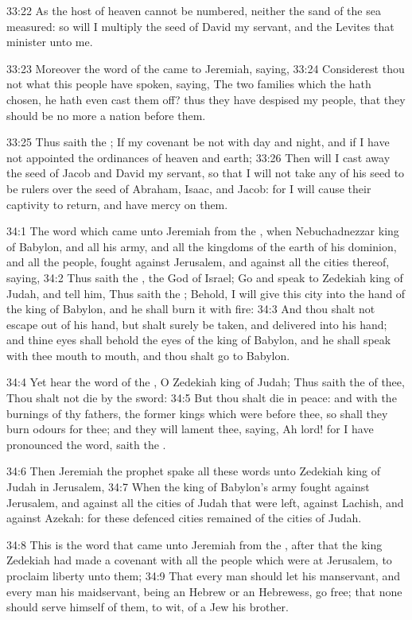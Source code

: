33:22 As the host of heaven cannot be numbered, neither the sand of
the sea measured: so will I multiply the seed of David my servant, and
the Levites that minister unto me.

33:23 Moreover the word of the \LORD came to Jeremiah, saying, 33:24
Considerest thou not what this people have spoken, saying, The two
families which the \LORD hath chosen, he hath even cast them off? thus
they have despised my people, that they should be no more a nation
before them.

33:25 Thus saith the \LORD; If my covenant be not with day and night,
and if I have not appointed the ordinances of heaven and earth; 33:26
Then will I cast away the seed of Jacob and David my servant, so that
I will not take any of his seed to be rulers over the seed of Abraham,
Isaac, and Jacob: for I will cause their captivity to return, and have
mercy on them.

34:1 The word which came unto Jeremiah from the \LORD, when
Nebuchadnezzar king of Babylon, and all his army, and all the kingdoms
of the earth of his dominion, and all the people, fought against
Jerusalem, and against all the cities thereof, saying, 34:2 Thus saith
the \LORD, the God of Israel; Go and speak to Zedekiah king of Judah,
and tell him, Thus saith the \LORD; Behold, I will give this city into
the hand of the king of Babylon, and he shall burn it with fire: 34:3
And thou shalt not escape out of his hand, but shalt surely be taken,
and delivered into his hand; and thine eyes shall behold the eyes of
the king of Babylon, and he shall speak with thee mouth to mouth, and
thou shalt go to Babylon.

34:4 Yet hear the word of the \LORD, O Zedekiah king of Judah; Thus
saith the \LORD of thee, Thou shalt not die by the sword: 34:5 But thou
shalt die in peace: and with the burnings of thy fathers, the former
kings which were before thee, so shall they burn odours for thee; and
they will lament thee, saying, Ah lord! for I have pronounced the
word, saith the \LORD.

34:6 Then Jeremiah the prophet spake all these words unto Zedekiah
king of Judah in Jerusalem, 34:7 When the king of Babylon's army
fought against Jerusalem, and against all the cities of Judah that
were left, against Lachish, and against Azekah: for these defenced
cities remained of the cities of Judah.

34:8 This is the word that came unto Jeremiah from the \LORD, after
that the king Zedekiah had made a covenant with all the people which
were at Jerusalem, to proclaim liberty unto them; 34:9 That every man
should let his manservant, and every man his maidservant, being an
Hebrew or an Hebrewess, go free; that none should serve himself of
them, to wit, of a Jew his brother.

